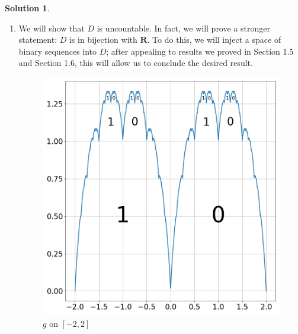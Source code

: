 \documentclass[12pt]{article}
\theoremstyle{definition}
\theoremstyle{exercise}
\theoremstyle{solution}
\newtheorem*{solution}{Solution}
\newcommand{\R}{\mathbf{R}}
\begin{document}
\begin{solution}
\begin{enumerate}
        \item We will show that \( D \) is uncountable. In fact, we will prove a stronger statement: \( D \) is in bijection with \( \R \). To do this, we will inject a space of binary sequences into \( D \); after appealing to results we proved in Section 1.5 and Section 1.6, this will allow us to conclude the desired result.

        \begin{figure}
            \centering
            \includegraphics[width=16cm]{UA_Section_5_4_Figure_5.png}
            \caption{\( g \) on \( [-2, 2] \)}
            \label{fig:3}
        \end{figure}
        

\end{enumerate}
\end{solution}
\end{document}
